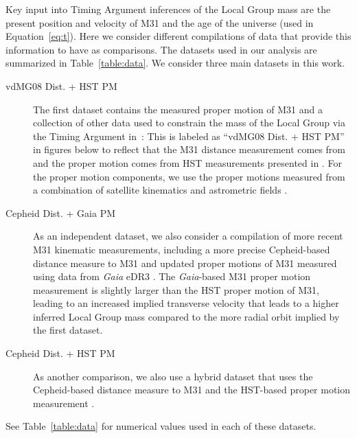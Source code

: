 \documentclass[twocolumn]{aastex631}
\begin{document}
Key input into Timing Argument inferences of the Local Group mass are the
present position and velocity of M31 and the age of the universe (used in
Equation~\ref{eq:t}).
Here we consider different compilations of data that provide this information to
have as comparisons.
The datasets used in our analysis are summarized in Table~\ref{table:data}.
We consider three main datasets in this work.
\begin{description}
  \item[vdMG08 Dist. + HST PM] The first dataset contains the measured proper
  motion of M31 and a collection of other data used to constrain the mass of the
  Local Group via the Timing Argument in~\citet{vdm2012}: This is labeled as
  ``vdMG08 Dist. + HST PM'' in figures below to reflect that the M31 distance
  measurement comes from \citet{vdm2008} and the proper motion comes from HST
  measurements presented in \citet{vdm2012}. For the proper motion components,
  we use the proper motions measured from a combination of satellite kinematics
  and astrometric fields \cite{vdm2012}.
  \item[Cepheid Dist. + Gaia PM] As an independent dataset, we also consider a
  compilation of more recent M31 kinematic measurements, including a more
  precise Cepheid-based distance measure to M31 \citep{Li2021} and updated
  proper motions of M31 measured using data from \textit{Gaia} eDR3
  \citep{Salomon2021}. The \textit{Gaia}-based M31 proper motion measurement is
  slightly larger than the HST proper motion of M31, leading to an increased
  implied transverse velocity that leads to a higher inferred Local Group mass
  compared to the more radial orbit implied by the first dataset.
  \item[Cepheid Dist. + HST PM] As another comparison, we also use a hybrid
  dataset that uses the Cepheid-based distance measure to M31 and the HST-based
  proper motion measurement \citep{Li2021,vdm2012}.
\end{description}
See Table~\ref{table:data} for numerical values used in each of these datasets.
\end{document}
